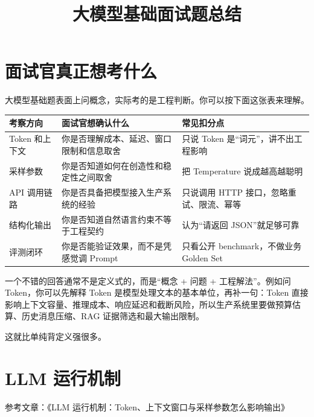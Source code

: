\documentclass[9pt,a4paper,twocolumn]{ctexart}
\begin{document}
\title{大模型基础面试题总结}
\date{}
\maketitle
{}

\section*{面试官真正想考什么}


大模型基础题表面上问概念，实际考的是工程判断。你可以按下面这张表来理解。


{\footnotesize
\begin{tabular}{|p{}|p{}|p{}|}
\hline
\textbf{考察方向} & \textbf{面试官想确认什么} & \textbf{常见扣分点} \\
\hline
Token 和上下文 & 你是否理解成本、延迟、窗口限制和信息取舍 & 只说 Token 是“词元”，讲不出工程影响 \\
\hline
采样参数 & 你是否知道如何在创造性和稳定性之间取舍 & 把 Temperature 说成越高越聪明 \\
\hline
API 调用链路 & 你是否具备把模型接入生产系统的经验 & 只说调用 HTTP 接口，忽略重试、限流、幂等 \\
\hline
结构化输出 & 你是否知道自然语言约束不等于工程契约 & 认为“请返回 JSON”就足够可靠 \\
\hline
评测闭环 & 你是否能验证效果，而不是凭感觉调 Prompt & 只看公开 benchmark，不做业务 Golden Set \\
\hline
\end{tabular}
}



一个不错的回答通常不是定义式的，而是“概念 + 问题 + 工程解法”。例如问 Token，你可以先解释 Token 是模型处理文本的基本单位，再补一句：Token 直接影响上下文容量、推理成本、响应延迟和截断风险，所以生产系统里要做预算估算、历史消息压缩、RAG 证据筛选和最大输出限制。



这就比单纯背定义强很多。



\section*{LLM 运行机制}


参考文章：《LLM 运行机制：Token、上下文窗口与采样参数怎么影响输出》
\end{document}
